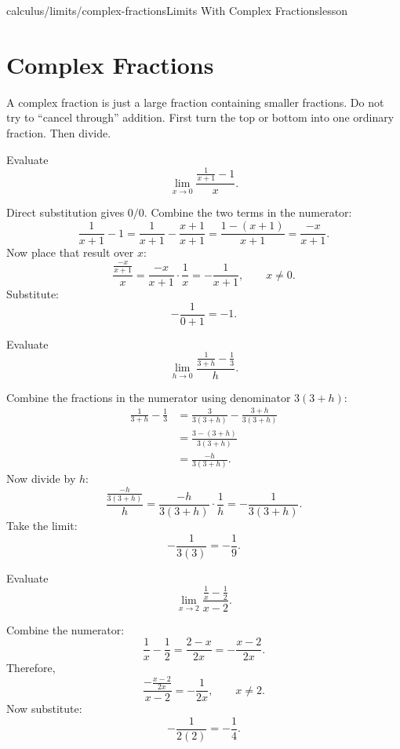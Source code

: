 \begin{webpage}{calculus/limits/complex-fractions}{Limits With Complex Fractions}{lesson}
\section{Complex Fractions}


\begin{bgconcept}
A complex fraction is just a large fraction containing smaller fractions. Do not try to ``cancel through'' addition. First turn the top or bottom into one ordinary fraction. Then divide.
\end{bgconcept}

\begin{bgguided}[title={Combine the numerator first}]
Evaluate
\[
  \lim_{x\to0}\frac{\frac1{x+1}-1}{x}.
\]

\begin{bgsolution}
Direct substitution gives \(0/0\). Combine the two terms in the numerator:
\[
  \frac1{x+1}-1
  =\frac1{x+1}-\frac{x+1}{x+1}
  =\frac{1-(x+1)}{x+1}
  =\frac{-x}{x+1}.
\]
Now place that result over \(x\):
\[
  \frac{\frac{-x}{x+1}}{x}
  =\frac{-x}{x+1}\cdot\frac1x
  =-\frac1{x+1},\qquad x\ne0.
\]
Substitute:
\[
  -\frac1{0+1}=\boxed{-1}.
\]
\end{bgsolution}
\end{bgguided}

\begin{bgexample}[title={Difference quotient for a reciprocal}]
Evaluate
\[
  \lim_{h\to0}
  \frac{\frac1{3+h}-\frac13}{h}.
\]

\begin{bgsolution}
Combine the fractions in the numerator using denominator \(3(3+h)\):
\begin{align*}
\frac1{3+h}-\frac13
&=\frac3{3(3+h)}-\frac{3+h}{3(3+h)}\\
&=\frac{3-(3+h)}{3(3+h)}\\
&=\frac{-h}{3(3+h)}.
\end{align*}
Now divide by \(h\):
\[
  \frac{\frac{-h}{3(3+h)}}{h}
  =\frac{-h}{3(3+h)}\cdot\frac1h
  =-\frac1{3(3+h)}.
\]
Take the limit:
\[
  -\frac1{3(3)}=\boxed{-\frac19}.
\]
\end{bgsolution}
\end{bgexample}

\begin{bgexample}[title={Exam-level: two rational terms}]
Evaluate
\[
  \lim_{x\to2}
  \frac{\frac1x-\frac12}{x-2}.
\]

\begin{bgsolution}
Combine the numerator:
\[
  \frac1x-\frac12=\frac{2-x}{2x}=-\frac{x-2}{2x}.
\]
Therefore,
\[
  \frac{-\frac{x-2}{2x}}{x-2}
  =-\frac1{2x},\qquad x\ne2.
\]
Now substitute:
\[
  -\frac1{2(2)}=\boxed{-\frac14}.
\]
\end{bgsolution}
\end{bgexample}
\end{webpage}


